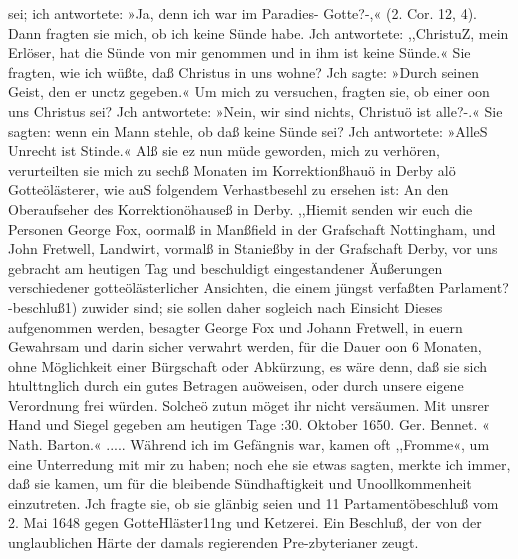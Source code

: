 sei; ich antwortete: »Ja, denn ich war im Paradies- Gotte?-,«
(2. Cor. 12, 4). Dann fragten sie mich, ob ich keine Sünde habe.
Jch antwortete: ,,ChristuZ, mein Erlöser, hat die Sünde von mir
genommen und in ihm ist keine Sünde.« Sie fragten, wie ich
wüßte, daß Christus in uns wohne? Jch sagte: »Durch seinen
Geist, den er unctz gegeben.« Um mich zu versuchen, fragten sie,
ob einer oon uns Christus sei? Jch antwortete: »Nein, wir
sind nichts, Christuö ist alle?-.« Sie sagten: wenn ein Mann
stehle, ob daß keine Sünde sei? Jch antwortete: »AlleS Unrecht
ist Stinde.« Alß sie ez nun müde geworden, mich zu verhören,
verurteilten sie mich zu sechß Monaten im Korrektionßhauö in
Derby alö Gotteölästerer, wie auS folgendem Verhastbesehl zu
ersehen ist:
An den Oberaufseher des Korrektionöhauseß in Derby.
,,Hiemit senden wir euch die Personen George Fox, oormalß
in Manßfield in der Grafschaft Nottingham, und John Fretwell,
Landwirt, vormalß in Stanießby in der Grafschaft Derby, vor
uns gebracht am heutigen Tag und beschuldigt eingestandener
Äußerungen verschiedener gotteölästerlicher Ansichten, die einem
jüngst verfaßten Parlament?-beschluß1) zuwider sind; sie sollen daher
sogleich nach Einsicht Dieses aufgenommen werden, besagter
George Fox und Johann Fretwell, in euern Gewahrsam und
darin sicher verwahrt werden, für die Dauer oon 6 Monaten,
ohne Möglichkeit einer Bürgschaft oder Abkürzung, es wäre denn,
daß sie sich htulttnglich durch ein gutes Betragen auöweisen, oder
durch unsere eigene Verordnung frei würden. Solcheö zutun
möget ihr nicht versäumen.
Mit unsrer Hand und Siegel gegeben am heutigen Tage
:30. Oktober 1650. Ger. Bennet. «
Nath. Barton.« .....
Während ich im Gefängnis war, kamen oft ,,Fromme«, um eine
Unterredung mit mir zu haben; noch ehe sie etwas sagten, merkte
ich immer, daß sie kamen, um für die bleibende Sündhaftigkeit und
Unoollkommenheit einzutreten. Jch fragte sie, ob sie glänbig seien und
11 Partamentöbeschluß vom 2. Mai 1648 gegen GotteHläster11ng und
Ketzerei. Ein Beschluß, der von der unglaublichen Härte der damals regierenden
Pre-zbyterianer zeugt.


